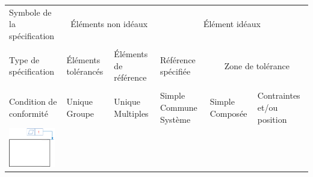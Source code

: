 \documentclass[11pt,oneside]{article}
\begin{document}
\begin{exemple}
\footnotesize{
\begin{center}
\begin{tabular}{|p{}|p{}|p{}|p{}|p{}|p{}|}
\hline
Symbole de la spécification & 
\multicolumn{2}{c|}{Éléments non idéaux} &
\multicolumn{3}{c|}{Élément idéaux} \\
&
\multicolumn{2}{c|}{} &
\multicolumn{3}{c|}{}\\
\hline
Type de spécification & 
Éléments tolérancés &
Éléments de référence & 
Référence spécifiée & 
\multicolumn{2}{c|}{Zone de tolérance} \\
&&&&
\multicolumn{2}{c|}{}\\
\hline
Condition de conformité & 
Unique Groupe & Unique Multiples &
Simple Commune Système &
Simple Composée & 
Contraintes et/ou position \\
\hline
\multirow{12}{*}{\includegraphics[width=2cm]{png/ex_planeite}}&&&&&\\
&&&&&\\
&&&&&\\
&&&&&\\
&&&&&\\
&&&&&\\
&&&&&\\
&&&&&\\
&&&&&\\
&&&&&\\
&&&&&\\
&&&&&\\
\hline
\end{tabular}
\end{center}
}
\end{exemple}
\end{document}
